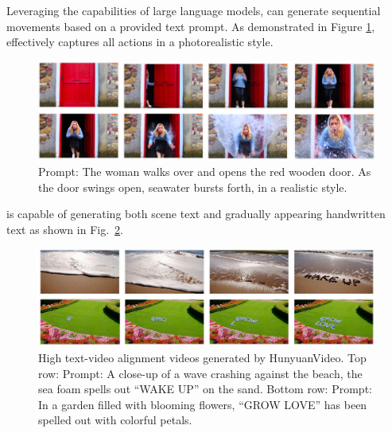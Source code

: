 Leveraging the capabilities of large language models, \nameofmethod{} can generate sequential movements based on a provided text prompt. As demonstrated in Figure \ref{fig:sequential-move}, \nameofmethod{} effectively captures all actions in a photorealistic style.
\begin{figure}[ht]
    \centering
    \includegraphics[width=\linewidth]{figures/sequential_motion.png}
    \caption{{Prompt: The woman walks over and opens the red wooden door. As the door swings open, seawater bursts forth, in a realistic style.}}
    \label{fig:sequential-move}
\end{figure}

\nameofmethod{} is capable of generating both scene text and gradually appearing handwritten text as shown in Fig.~\ref{fig:ocr}. 



\begin{figure}[!htbp]
    \centering    \includegraphics[width=\linewidth]{figures/ocr.png}
    \caption{High text-video alignment videos generated by HunyuanVideo. Top row: Prompt: A close-up of a wave crashing against the beach, the sea foam spells out ``WAKE UP'' on the sand. Bottom row: Prompt: In a garden filled with blooming flowers, ``GROW LOVE'' has been spelled out with colorful petals.}
    \label{fig:ocr}
\end{figure}



